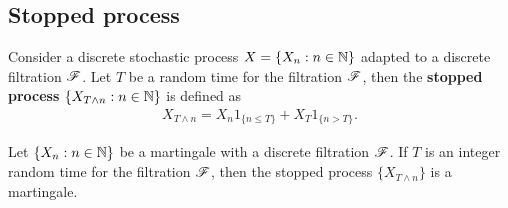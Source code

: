 \documentclass[a4paper,10pt,english]{article}
\begin{document}
\subsection{Stopped process}
Consider a discrete stochastic process $X = \{X_n: n\in \mathbb{N}\}$ adapted to a discrete filtration $\mathscr{F}$. 
Let $T$ be a random time for the filtration $\mathscr{F}$, 
then the \textbf{stopped process} $\{X_{T\wedge n}: n \in \mathbb{N}\}$ is defined as 
\begin{align*}
X_{T\wedge n} = X_n1_{\{n \leq T\}} + X_T1_{\{n > T\}}.
\end{align*}
\begin{prop}
Let  $\{X_n: n\in \mathbb{N}\}$ be a martingale with a discrete filtration $\mathscr{F}$. 
If $T$ is an integer random time for the filtration $\mathscr{F}$, 
then the stopped process $\{X_{T\wedge n}\}$ is a martingale. 
\end{prop}
\end{document}

